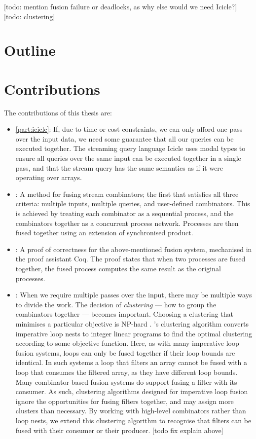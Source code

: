 [todo: mention fusion failure or deadlocks, as why else would we need Icicle?]
[todo: clustering]

\section{Outline}
\section{Contributions}

The contributions of this thesis are:

\begin{itemize}
\item
  \autoref{part:icicle}:
If, due to time or cost constraints, we can only afford one pass over the input data, we need some guarantee that all our queries can be executed together.
The streaming query language Icicle uses modal types to ensure all queries over the same input can be executed together in a single pass, and that the stream query has the same semantics as if it were operating over arrays.

\item
{}:
A method for fusing stream combinators; the first that satisfies all three criteria: multiple inputs, multiple queries, and user-defined combinators.
This is achieved by treating each combinator as a sequential process, and the combinators together as a concurrent process network.
Processes are then fused together using an extension of synchronised product.

\item
  :
A proof of correctness for the above-mentioned fusion system, mechanised in the proof assistant Coq.
The proof states that when two processes are fused together, the fused process computes the same result as the original processes.

\item
  :
When we require multiple passes over the input, there may be multiple ways to divide the work.
The decision of \emph{clustering} --- how to group the combinators together --- becomes important.
Choosing a clustering that minimises a particular objective is NP-hard \cite{darte1999complexity}.
\cite{megiddo1998optimal}'s clustering algorithm converts imperative loop nests to integer linear programs to find the optimal clustering according to some objective function.
Here, as with many imperative loop fusion systems, loops can only be fused together if their loop bounds are identical.
In such systems a loop that filters an array cannot be fused with a loop that consumes the filtered array, as they have different loop bounds.
Many combinator-based fusion systems do support fusing a filter with its consumer.
As such, clustering algorithms designed for imperative loop fusion ignore the opportunities for fusing filters together, and may assign more clusters than necessary.
By working with high-level combinators rather than loop nests, we extend this clustering algorithm to recognise that filters can be fused with their consumer or their producer.
[todo fix explain above]
\end{itemize}



